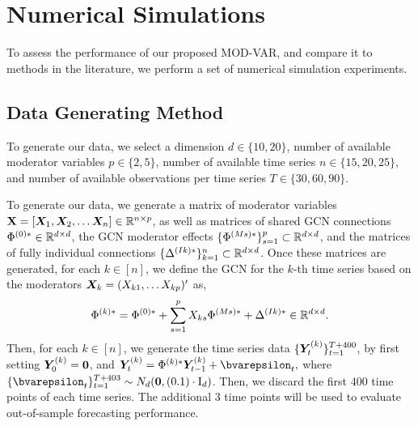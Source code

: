 \section{Numerical Simulations}\label{section:simulations}  

To assess the performance of our proposed MOD-VAR, and compare it to methods in the literature, we perform a set of numerical simulation experiments. 

\subsection{Data Generating Method}


To generate our data, we select a dimension $d\in \{10,20\}$, number of available moderator variables $p \in \{2,5\}$, number of available time series $n\in\{15,20,25\}$, and number of available observations per time series $T \in\{30,60,90\}$.

To generate our data, we generate a matrix of moderator variables $\mathbf{X} = [\bm{X}_1, \bm{X}_2,\ldots \bm{X}_{n}]\in\mathbb{R}^{n \times p}$, as well as matrices of shared GCN connections $\Phi^{(0)*}\in\mathbb{R}^{d\times d}$, the GCN moderator effects $\{\Phi^{(Ms)*}\}_{s=1}^p\subset\mathbb{R}^{d\times d}$, and the matrices of fully individual connections $\{\Delta^{(Ik)*}\}_{k=1}^n \subset \mathbb{R}^{d\times d}$. Once these matrices are generated, for each $k\in[n]$, we define the GCN for the $k$-th time series based on the moderators $\bm{X}_k = (X_{k1},\ldots X_{kp})'$ as,
\begin{align*}
	\Phi^{(k)*} = \Phi^{(0)*} + \sum_{s=1}^p X_{ks} \Phi^{(Ms)*} + \Delta^{(Ik)*}\in\mathbb{R}^{d\times d}.
\end{align*}
Then, for each $k\in[n]$, we generate the time series data $\{\bm{Y}^{(k)}_t\}_{t=1}^{T+400}$, by first setting $\bm{Y}^{(k)}_0 = {\mathbf{0}}$, and 
$ \bY^{(k)}_{t} = \Phi^{(k)*} \bY^{(k)}_{t-1} + \bvarepsilon_t , $
where $\{\bvarepsilon_{t}\}_{t=1}^{T+403}\sim N_d(\bzero, (0.1)\cdot \Ir_d)$. Then, we discard the first 400 time points of each time series. The additional 3 time points will be used to evaluate out-of-sample forecasting performance. 

